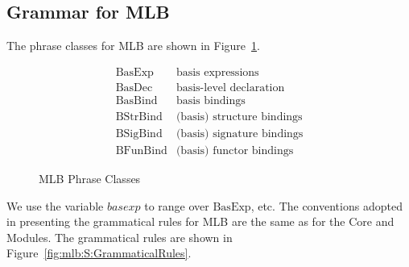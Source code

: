 \documentclass[draft]{article}
\renewcommand{\mit}[1]{\mathit{#1}}
\newcommand{\mrm}[1]{\mathrm{#1}}
\begin{document}
\subsection{Grammar for MLB}
The phrase classes for MLB are shown in
Figure~\ref{fig:mlb:S:PhraseClasses}.
\begin{figure}[h]
\begin{displaymath}
\begin{array}{ll}
\mrm{BasExp} & \mbox{basis expressions} \\
\mrm{BasDec} & \mbox{basis-level declaration} \\
\mrm{BasBind} & \mbox{basis bindings} \\
\mrm{BStrBind} & \mbox{(basis) structure bindings} \\
\mrm{BSigBind} & \mbox{(basis) signature bindings} \\
\mrm{BFunBind} & \mbox{(basis) functor bindings}
\end{array}
\end{displaymath}
\caption{MLB Phrase Classes}\label{fig:mlb:S:PhraseClasses}
\end{figure}
We use the variable $\mit{basexp}$ to range over $\mrm{BasExp}$, etc.
The conventions adopted in presenting the grammatical rules for MLB
are the same as for the Core and Modules.  The grammatical rules are
shown in Figure~\ref{fig:mlb:S:GrammaticalRules}.
\end{document}
